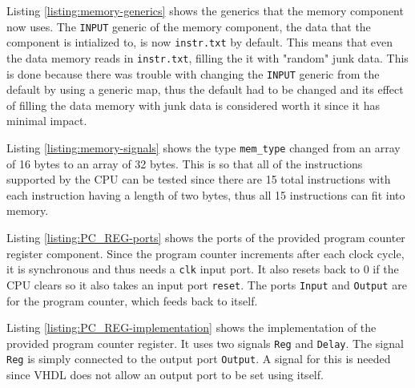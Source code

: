 \documentclass[11pt]{report}
\begin{document}
Listing \ref{listing:memory-generics} shows the generics that the memory component now uses. The
\verb|INPUT| generic of the memory component, the data that the component is intialized to, is now
\verb|instr.txt| by default. This means that even the data memory reads in \verb|instr.txt|, filling
the it with "random" junk data. This is done because there was trouble with changing the
\verb|INPUT| generic from the default by using a generic map, thus the default had to be changed and
its effect of filling the data memory with junk data is considered worth it since it has minimal
impact.

Listing \ref{listing:memory-signals} shows the type \verb|mem_type| changed from an array of 16
bytes to an array of 32 bytes. This is so that all of the instructions supported by the CPU can be
tested since there are 15 total instructions with each instruction having a length of two bytes,
thus all 15 instructions can fit into memory.


Listing \ref{listing:PC_REG-ports} shows the ports of the provided program counter register
component. Since the program counter increments after each clock cycle, it is synchronous and thus
needs a \verb|clk| input port. It also resets back to 0 if the CPU clears so it also takes an input
port \verb|reset|. The ports \verb|Input| and \verb|Output| are for the program counter, which feeds
back to itself. 


Listing \ref{listing:PC_REG-implementation} shows the implementation of the provided program counter
register. It uses two signals \verb|Reg| and \verb|Delay|. The signal \verb|Reg| is simply connected
to the output port \verb|Output|. A signal for this is needed since VHDL does not allow an output
port to be set using itself.
\end{document}
